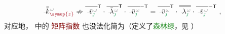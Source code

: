 \begin{align} \label{eq:kz-non_diagonalization}
	\Xint{\begin{smallmatrix} ~ \\ {}^{}_{\mathcolor{gray}{-}} \\ ~ \end{smallmatrix}}{15}{\bar{\bar{k}}}_{\textcolor{Maroon}{\symup{z}}}^{\;\! \mathcolor{gray}{\omega}} \nRightarrow \overline{\Xint{\begin{smallmatrix} ~ \\ {}^{}_{\mathcolor{gray}{-}} \\ ~ \end{smallmatrix}}{15}{\bar{v}}^{\;\!\mathcolor{gray}{\omega}}_{\textcolor{ForestGreen}{\jmath}}}^\mathsf{T} \cdot \overline{\Xint{\begin{smallmatrix} ~ \\ {}^{}_{\mathcolor{gray}{-}} \\ ~ \end{smallmatrix}}{22}{\bar{\lambda}}^{\;\!\mathcolor{gray}{\omega}}_{\textcolor{ForestGreen}{\jmath}}}^\mathsf{T} \cdot \overline{\Xint{\begin{smallmatrix} ~ \\ {}^{}_{\mathcolor{gray}{-}} \\ ~ \end{smallmatrix}}{15}{\bar{v}}^{\;\!\mathcolor{gray}{\omega}}_{\textcolor{ForestGreen}{\jmath}}}^{-\mathsf{T}} = \overline{\Xint{\begin{smallmatrix} ~ \\ {}^{}_{\mathcolor{gray}{-}} \\ ~ \end{smallmatrix}}{15}{\bar{v}}^{\;\!\mathcolor{gray}{\omega}}_{\textcolor{ForestGreen}{\jmath}}}^\mathsf{T} \cdot \overline{\overline{\Xint{\begin{smallmatrix} ~ \\ {}^{}_{\mathcolor{gray}{-}} \\ ~ \end{smallmatrix}}{22}{\lambda}^{\;\!\mathcolor{gray}{\omega}}_{\textcolor{ForestGreen}{\jmath}}}} \cdot \overline{\Xint{\begin{smallmatrix} ~ \\ {}^{}_{\mathcolor{gray}{-}} \\ ~ \end{smallmatrix}}{15}{\bar{v}}^{\;\!\mathcolor{gray}{\omega}}_{\textcolor{ForestGreen}{\jmath}}}^{-\mathsf{T}} ~,
\end{align}
对应地， 中的 \textcolor{Maroon}{矩阵指数} 也没法化简为（定义了\textcolor{ForestGreen}{森林绿}，见 ）
